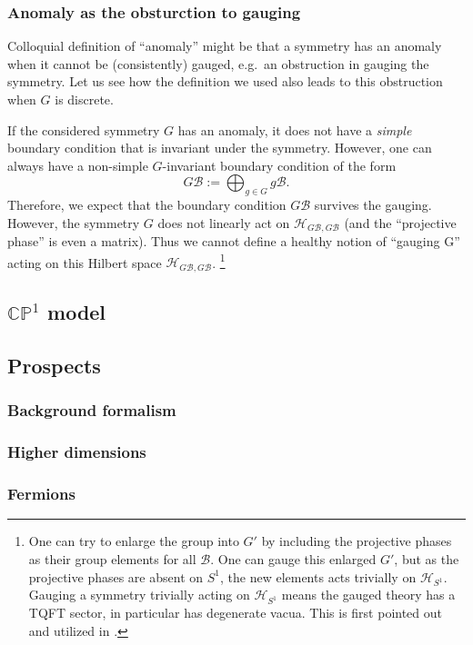 \documentclass[
]{scrartcl}
\numberwithin{equation}{section}
\theoremstyle{definition}
\theoremstyle{definition}
\theoremstyle{definition}
\theoremstyle{definition}
\theoremstyle{remark}
\begin{document}
\hypertarget{anomaly-as-the-obsturction-to-gauging}{%
\subsubsection{Anomaly as the obsturction to gauging}\label{anomaly-as-the-obsturction-to-gauging}}

Colloquial definition of ``anomaly'' might be that a symmetry has an anomaly when it cannot be (consistently) gauged, e.g.~an obstruction in gauging the symmetry.
Let us see how the definition we used also leads to this obstruction when \(G\) is discrete.

If the considered symmetry \(G\) has an anomaly, it does not have a \emph{simple} boundary condition that is invariant under the symmetry. However, one can always have a non-simple \(G\)-invariant boundary condition of the form
\begin{equation}
    \label{eq:GsumB}
    G\mathcal{B} := \bigoplus_{g\in G} g\mathcal{B}.
\end{equation}
Therefore, we expect that the boundary condition \(G\mathcal{B}\) survives the gauging. However, the symmetry \(G\) does not linearly act on \(\mathcal{H}_{G\mathcal{B},G\mathcal{B}}\) (and the ``projective phase'' is even a matrix).
Thus we cannot define a healthy notion of ``gauging G'' acting on this Hilbert space \(\mathcal{H}_{G\mathcal{B},G\mathcal{B}}\). \footnote{One can try to enlarge the group into \(G'\) by including the projective phases as their group elements for all \(\mathcal{B}\). One can gauge this enlarged \(G'\), but as the projective phases are absent on \(S^1\), the new elements acts trivially on \(\mathcal{H}_{S^1}\).
  Gauging a symmetry trivially acting on \(\mathcal{H}_{S^1}\) means the gauged theory has a TQFT sector, in particular has degenerate vacua.
  This is first pointed out and utilized in \autocite{Witten:2016cio,WWW}.}

\hypertarget{mathbbcp1-model}{%
\subsection{\texorpdfstring{\(\mathbb{CP}^1\) model}{\textbackslash mathbb\{CP\}\^{}1 model}}\label{mathbbcp1-model}}

\hypertarget{prospects}{%
\subsection{Prospects}\label{prospects}}

\hypertarget{background-formalism}{%
\subsubsection{Background formalism}\label{background-formalism}}

\hypertarget{higher-dimensions}{%
\subsubsection{Higher dimensions}\label{higher-dimensions}}

\hypertarget{fermions}{%
\subsubsection{Fermions}\label{fermions}}

\printbibliography
\end{document}
